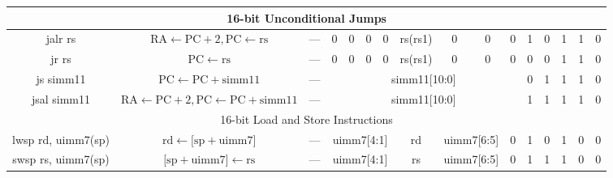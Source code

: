 \documentclass[a4paper,10pt]{article}
\begin{document}
\begin{landscape}
\begin{longtable}[c]{|c|c|@{}c@{}|@{}c@{}|@{}c@{}|@{}c@{}|@{}c@{}|@{}c@{}|@{}c@{}|@{}c@{}|@{}c@{}|@{}c@{}|@{}c@{}|@{}c@{}|@{}c@{}|@{}c@{}|@{}c@{}|@{}c@{}|@{}c@{}|@{}c@{}|@{}c@{}|@{}c@{}|@{}c@{}|@{}c@{}|@{}c@{}|@{}c@{}|}
\hline
\multicolumn{26}{|c|}{16-bit Unconditional Jumps}                                                                                                                                                                                                                                                             \\\hline
jalr rs               & $\mathrm{RA} \leftarrow \mathrm{PC} + 2, \mathrm{PC} \leftarrow \mathrm{rs}$ & \multicolumn{8}{c|}{---}                                   & 0      & 0    & 0    & 0   & \multicolumn{4}{c|}{rs(rs1)} & 0              & 0              & 0 & 1   & 0   & 1 & 1 & 0 \\
jr rs                 & $\mathrm{PC} \leftarrow \mathrm{rs}$ & \multicolumn{8}{c|}{---}                                   & 0      & 0    & 0    & 0   & \multicolumn{4}{c|}{rs(rs1)} & 0              & 0              & 0 & 0   & 0   & 1 & 1 & 0 \\
js simm11             & $\mathrm{PC} \leftarrow \mathrm{PC} + \mathrm{simm11}$ & \multicolumn{8}{c|}{---}                                   & \multicolumn{11}{c|}{simm11{[}10:0{]}}                                                                        & 0   & 1   & 1 & 1 & 0 \\
jsal simm11           & $\mathrm{RA} \leftarrow \mathrm{PC} + 2, \mathrm{PC} \leftarrow \mathrm{PC} + \mathrm{simm11}$ & \multicolumn{8}{c|}{---}                                   & \multicolumn{11}{c|}{simm11{[}10:0{]}}                                                                        & 1   & 1   & 1 & 1 & 0 \\

\hline
\multicolumn{26}{|c|}{16-bit Load and Store Instructions}                                                                                                                                                                                                                                                             \\\hline
lwsp rd, uimm7(sp)    & $\mathrm{rd} \leftarrow {[}\mathrm{sp} + \mathrm{uimm7}{]}$ & \multicolumn{8}{c|}{---}                                   & \multicolumn{4}{c|}{uimm7{[}4:1{]}} & \multicolumn{4}{c|}{rd}      & \multicolumn{2}{c|}{uimm7{[}6:5{]}}  & 0   & 1   & 0   & 1 & 0 & 0 \\
swsp rs, uimm7(sp)    & ${[}\mathrm{sp} + \mathrm{uimm7}{]} \leftarrow \mathrm{rs}$ & \multicolumn{8}{c|}{---}                                   & \multicolumn{4}{c|}{uimm7{[}4:1{]}} & \multicolumn{4}{c|}{rs}      & \multicolumn{2}{c|}{uimm7{[}6:5{]}}  & 0   & 1   & 1   & 1 & 0 & 0 \\


\end{longtable}
\end{landscape}
\end{document}
